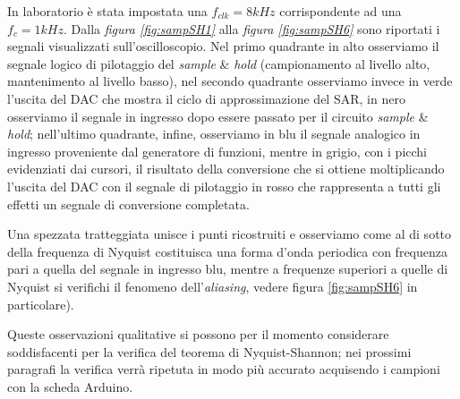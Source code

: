 \documentclass[journal]{IEEEtran}
\begin{document}


In laboratorio è stata impostata una $f_{clk} = 8 kHz$ corrispondente ad una $f_c = 1 kHz$. 
Dalla \textit{figura \ref{fig:sampSH1}} alla \textit{figura \ref{fig:sampSH6}} sono riportati i segnali visualizzati sull'oscilloscopio. 
Nel primo quadrante in alto osserviamo il segnale logico di pilotaggio del \textit{sample} \& \textit{hold} (campionamento al livello alto, mantenimento al livello basso), nel secondo quadrante osserviamo invece in verde l'uscita del DAC che mostra il ciclo di approssimazione del SAR, in nero osserviamo il segnale in ingresso dopo essere passato per il circuito \textit{sample} \& \textit{hold}; nell'ultimo quadrante, infine, osserviamo in blu il segnale analogico in ingresso proveniente dal generatore di funzioni, mentre in grigio, con i picchi evidenziati dai cursori, il risultato della conversione che si ottiene moltiplicando l'uscita del DAC con il segnale di pilotaggio in rosso che rappresenta a tutti gli effetti un segnale di conversione completata. 

Una spezzata tratteggiata unisce i punti ricostruiti e osserviamo come al di sotto della frequenza di Nyquist costituisca una forma d'onda periodica con frequenza pari a quella del segnale in ingresso blu, mentre a frequenze superiori a quelle di Nyquist si verifichi il fenomeno dell'\textit{aliasing}, vedere figura \ref{fig:sampSH6} in particolare).

Queste osservazioni qualitative si possono per il momento considerare soddisfacenti per la verifica del teorema di Nyquist-Shannon; nei prossimi paragrafi la verifica verrà ripetuta in modo più accurato acquisendo i campioni con la scheda Arduino.
\end{document}
